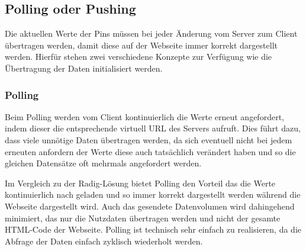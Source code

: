 
\subsection{Polling oder Pushing}
Die aktuellen Werte der Pins müssen bei jeder Änderung vom Server zum Client übertragen
werden, damit diese auf der Webseite immer korrekt dargestellt werden. Hierfür stehen zwei
verschiedene Konzepte zur Verfügung wie die Übertragung der Daten initialisiert werden.

\subsubsection{Polling}
Beim Polling werden vom Client kontinuierlich die Werte erneut angefordert, indem dieser
die entsprechende virtuell URL des Servers aufruft. Dies führt dazu, dass viele unnötige
Daten übertragen werden, da sich eventuell nicht bei jedem erneuten anfordern der Werte
diese auch tatsächlich verändert haben und so die gleichen Datensätze oft mehrmals
angefordert werden.

Im Vergleich zu der Radig-Lösung bietet Polling den Vorteil das die Werte kontinuierlich
nach geladen und so immer korrekt dargestellt werden während die Webseite dargestellt
wird. Auch das gesendete Datenvolumen wird dahingehend minimiert, das nur die Nutzdaten
übertragen werden und nicht der gesamte HTML-Code der Webseite. Polling ist technisch sehr
einfach zu realisieren, da die Abfrage der Daten einfach zyklisch wiederholt werden.

